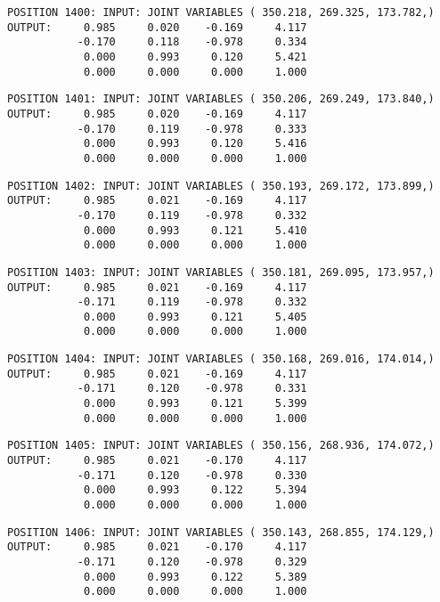\begin{verbatim}
POSITION 1400: INPUT: JOINT VARIABLES ( 350.218, 269.325, 173.782,)
OUTPUT:     0.985     0.020    -0.169     4.117
           -0.170     0.118    -0.978     0.334
            0.000     0.993     0.120     5.421
            0.000     0.000     0.000     1.000
\end{verbatim} \pagebreak[1]\begin{verbatim}
POSITION 1401: INPUT: JOINT VARIABLES ( 350.206, 269.249, 173.840,)
OUTPUT:     0.985     0.020    -0.169     4.117
           -0.170     0.119    -0.978     0.333
            0.000     0.993     0.120     5.416
            0.000     0.000     0.000     1.000
\end{verbatim} \pagebreak[1]\begin{verbatim}
POSITION 1402: INPUT: JOINT VARIABLES ( 350.193, 269.172, 173.899,)
OUTPUT:     0.985     0.021    -0.169     4.117
           -0.170     0.119    -0.978     0.332
            0.000     0.993     0.121     5.410
            0.000     0.000     0.000     1.000
\end{verbatim} \pagebreak[1]\begin{verbatim}
POSITION 1403: INPUT: JOINT VARIABLES ( 350.181, 269.095, 173.957,)
OUTPUT:     0.985     0.021    -0.169     4.117
           -0.171     0.119    -0.978     0.332
            0.000     0.993     0.121     5.405
            0.000     0.000     0.000     1.000
\end{verbatim} \pagebreak[1]\begin{verbatim}
POSITION 1404: INPUT: JOINT VARIABLES ( 350.168, 269.016, 174.014,)
OUTPUT:     0.985     0.021    -0.169     4.117
           -0.171     0.120    -0.978     0.331
            0.000     0.993     0.121     5.399
            0.000     0.000     0.000     1.000
\end{verbatim} \pagebreak[1]\begin{verbatim}
POSITION 1405: INPUT: JOINT VARIABLES ( 350.156, 268.936, 174.072,)
OUTPUT:     0.985     0.021    -0.170     4.117
           -0.171     0.120    -0.978     0.330
            0.000     0.993     0.122     5.394
            0.000     0.000     0.000     1.000
\end{verbatim} \pagebreak[1]\begin{verbatim}
POSITION 1406: INPUT: JOINT VARIABLES ( 350.143, 268.855, 174.129,)
OUTPUT:     0.985     0.021    -0.170     4.117
           -0.171     0.120    -0.978     0.329
            0.000     0.993     0.122     5.389
            0.000     0.000     0.000     1.000
\end{verbatim} \pagebreak[1]\begin{verbatim}

\end{verbatim}
